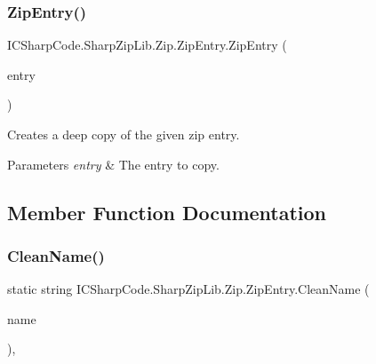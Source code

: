 \subsubsection{\texorpdfstring{Zip\+Entry()}{ZipEntry()}\hspace{0.1cm}{\footnotesize\ttfamily [4/4]}}
{\footnotesize\ttfamily I\+C\+Sharp\+Code.\+Sharp\+Zip\+Lib.\+Zip.\+Zip\+Entry.\+Zip\+Entry (\begin{DoxyParamCaption}\item[{\hyperlink{class_i_c_sharp_code_1_1_sharp_zip_lib_1_1_zip_1_1_zip_entry}{Zip\+Entry}}]{entry }\end{DoxyParamCaption})\hspace{0.3cm}{\ttfamily [inline]}}



Creates a deep copy of the given zip entry. 


\begin{DoxyParams}{Parameters}
{\em entry} & The entry to copy. \\
\hline
\end{DoxyParams}


\subsection{Member Function Documentation}
\mbox{\label{class_i_c_sharp_code_1_1_sharp_zip_lib_1_1_zip_1_1_zip_entry_a1eb0c6159ce91d0303ab617c109b6b0d}} 
\subsubsection{\texorpdfstring{Clean\+Name()}{CleanName()}\hspace{0.1cm}{\footnotesize\ttfamily [1/2]}}
{\footnotesize\ttfamily static string I\+C\+Sharp\+Code.\+Sharp\+Zip\+Lib.\+Zip.\+Zip\+Entry.\+Clean\+Name (\begin{DoxyParamCaption}\item[{string}]{name }\end{DoxyParamCaption})\hspace{0.3cm}{\ttfamily [inline]}, {\ttfamily [static]}}




